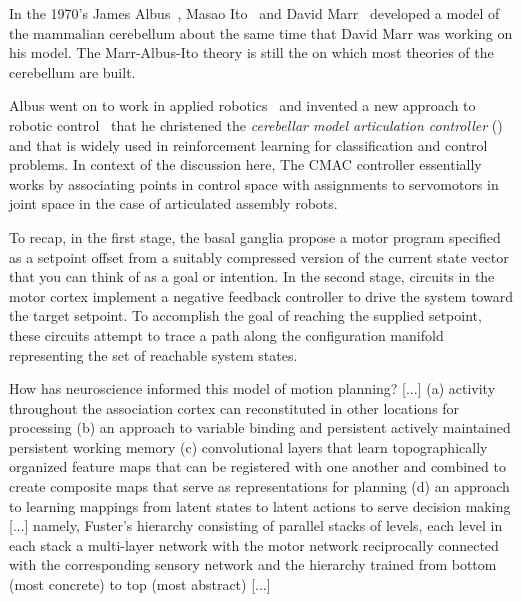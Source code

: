 
In the 1970's James Albus~\cite{AlbusMB-71}, Masao Ito~\cite{Ecclesetal1967neuronal} and David Marr~\cite{MarrJoP-69} developed a model of the mammalian cerebellum about the same time that David Marr was working on his model. The Marr-Albus-Ito theory {\emdash{}} is still the {} on which most theories of the cerebellum are built.

Albus went on to work in applied robotics~\cite{AlbusetalSME-84} and invented a new approach to robotic control~\cite{Albus75} that he christened the {\it{cerebellar model articulation controller}} ({}) and that is widely used in reinforcement learning for classification and control problems. In context of the discussion here, The CMAC controller essentially works by associating points in control space with assignments to servomotors in joint space in the case of articulated assembly robots.

To recap, in the first stage, the basal ganglia propose a motor program specified as a setpoint offset from a suitably compressed version of the current state vector that you can think of as a goal or intention. In the second stage, circuits in the motor cortex implement a negative feedback controller to drive the system toward the target setpoint. To accomplish the goal of reaching the supplied setpoint, these circuits attempt to trace a path along the configuration manifold representing the set of reachable system states.


How has neuroscience informed this model of motion planning? [...] (a) activity throughout the association cortex can reconstituted in other locations for processing (b) an approach to variable binding and persistent actively maintained persistent working memory (c) convolutional layers that learn topographically organized feature maps that can be registered with one another and combined to create composite maps that serve as representations for planning (d) an approach to learning mappings from latent states to latent actions to serve decision making [...] namely, Fuster's hierarchy consisting of parallel stacks of levels, each level in each stack a multi-layer network with the motor network reciprocally connected with the corresponding sensory network and the hierarchy trained from bottom (most concrete) to top (most abstract) [...] 

